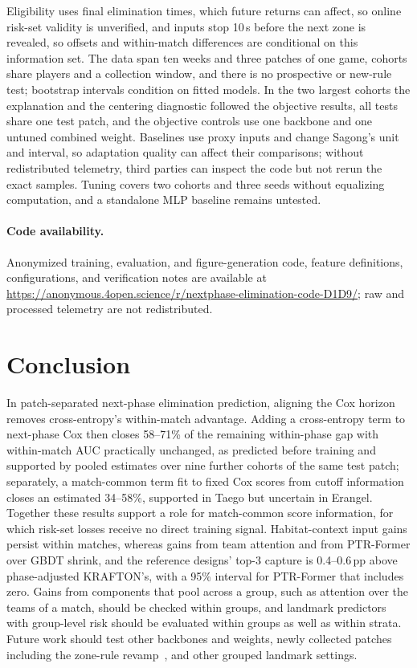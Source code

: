 \documentclass[sigconf,anonymous,nonacm]{acmart}
\newcommand{\artifacturl}{\url{https://anonymous.4open.science/r/nextphase-elimination-code-D1D9/}}
\begin{document}
Eligibility uses final elimination times, which future returns can affect, so online risk-set validity is unverified, and inputs stop 10\,s before the next zone is revealed, so offsets and within-match differences are conditional on this information set. The data span ten weeks and three patches of one game, cohorts share players and a collection window, and there is no prospective or new-rule test; bootstrap intervals condition on fitted models. In the two largest cohorts the explanation and the centering diagnostic followed the objective results, all tests share one test patch, and the objective controls use one backbone and one untuned combined weight. Baselines use proxy inputs and change Sagong's unit and interval, so adaptation quality can affect their comparisons; without redistributed telemetry, third parties can inspect the code but not rerun the exact samples. Tuning covers two cohorts and three seeds without equalizing computation, and a standalone MLP baseline remains untested.

\paragraph{Code availability.}
Anonymized training, evaluation, and figure-generation code, feature definitions, configurations, and verification notes are available at \artifacturl{}; raw and processed telemetry are not redistributed.

\section{Conclusion}
\label{sec:conclusion}
In patch-separated next-phase elimination prediction, aligning the Cox horizon removes cross-entropy's within-match advantage. Adding a cross-entropy term to next-phase Cox then closes 58--71\% of the remaining within-phase gap with within-match AUC practically unchanged, as predicted before training and supported by pooled estimates over nine further cohorts of the same test patch; separately, a match-common term fit to fixed Cox scores from cutoff information closes an estimated 34--58\%, supported in Taego but uncertain in Erangel. Together these results support a role for match-common score information, for which risk-set losses receive no direct training signal. Habitat-context input gains persist within matches, whereas gains from team attention and from PTR-Former over GBDT shrink, and the reference designs' top-3 capture is 0.4--0.6\,pp above phase-adjusted KRAFTON's, with a 95\% interval for PTR-Former that includes zero. Gains from components that pool across a group, such as attention over the teams of a match, should be checked within groups, and landmark predictors with group-level risk should be evaluated within groups as well as within strata. Future work should test other backbones and weights, newly collected patches including the zone-rule revamp~\cite{PUBGBlueZone2026}, and other grouped landmark settings.
\end{document}
